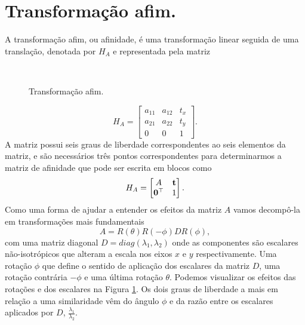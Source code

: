 \section*{Transformação afim.}
A transformação afim, ou afinidade, é uma transformação linear seguida de uma translação, denotada por $H_A$ e representada pela matriz
\begin{figure}[!htb]{\textwidth}
\caption{Transformação afim.}
\,
\,
\,
\,
\label{fig.angulos-afinidades}
\end{figure}
\begin{equation*}
H_A=
\begin{bmatrix}
a_{11}&a_{12}&t_x\\
a_{21}&a_{22}&t_y\\
0&0&1
\end{bmatrix}.
\end{equation*}
A matriz possui seis graus de liberdade correspondentes ao seis elementos da matriz, e são necessários três pontos correspondentes para determinarmos a matriz de afinidade que pode ser escrita em blocos como
\begin{equation*}
H_A=
\begin{bmatrix}
A&{\bf t}\\
{\bf 0}^\top&1
\end{bmatrix}.
\end{equation*}
Como uma forma de ajudar a entender os efeitos da matriz $A$ vamos decompô-la em transformações mais fundamentais
\begin{equation*}
A=R(\theta)R(-\phi)DR(\phi),
\end{equation*}
com uma matriz diagonal $D=diag(\lambda_1, \lambda_2)$ onde as componentes são escalares não-isotrópicos 
que alteram a escala nos eixos $x$ e $y$ respectivamente. Uma rotação $\phi$ que define o sentido de aplicação dos escalares da matriz $D$, uma rotação contrária $-\phi$ e uma última rotação $\theta$. Podemos visualizar os efeitos das rotações e dos escalares na Figura \ref{fig.angulos-afinidades}. Os dois graus de liberdade a mais em relação a uma similaridade vêm do ângulo $\phi$ e da razão entre os escalares aplicados por $D$, $\frac{\lambda_1}{\lambda_2}$. 


